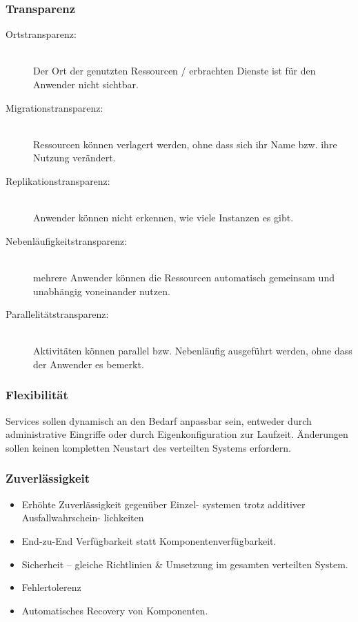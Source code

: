 \documentclass[a4paper, 10pt]{article}
\begin{document}
\subsubsection{Transparenz}
\begin{description}
	\item[Ortstransparenz:] \hfill \\ Der Ort der genutzten Ressourcen / erbrachten Dienste ist für den Anwender nicht sichtbar.
	\item[Migrationstransparenz:] \hfill \\ Ressourcen können verlagert werden, ohne dass sich ihr Name bzw. ihre Nutzung verändert.
	\item[Replikationstransparenz:] \hfill \\ Anwender können nicht erkennen, wie viele Instanzen es gibt.
	\item[Nebenläufigkeitstransparenz:] \hfill \\ mehrere Anwender können die Ressourcen automatisch gemeinsam und unabhängig voneinander nutzen.
	\item[Parallelitätstransparenz:] \hfill \\ Aktivitäten können parallel bzw. Nebenläufig ausgeführt werden, ohne dass der Anwender es bemerkt.
\end{description}

\subsubsection{Flexibilität}
Services sollen dynamisch an den Bedarf anpassbar sein, entweder durch administrative Eingriffe oder durch Eigenkonfiguration zur Laufzeit. Änderungen sollen keinen kompletten Neustart des verteilten Systems erfordern.

\subsubsection{Zuverlässigkeit}
\begin{itemize}
	\item Erhöhte Zuverlässigkeit gegenüber Einzel- systemen trotz additiver Ausfallwahrschein- lichkeiten
	\item End-zu-End Verfügbarkeit statt Komponentenverfügbarkeit.
	\item Sicherheit – gleiche Richtlinien \& Umsetzung im gesamten verteilten System.
	\item Fehlertolerenz
	\item Automatisches Recovery von Komponenten.
\end{itemize}
\end{document}
